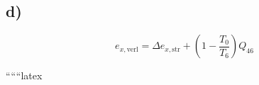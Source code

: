

\subsection*{d)}

\[
e_{x, \text{verl}} = \Delta e_{x, \text{str}} + \left( 1 - \frac{T_0}{T_6} \right) Q_{46}
\]

``````latex